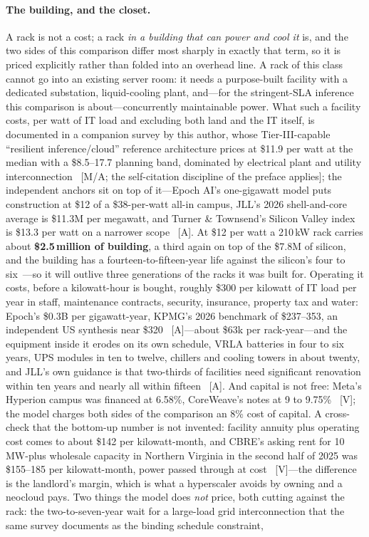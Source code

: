 \paragraph{The building, and the closet.} A rack is not a cost; a rack \emph{in a building that can power and cool it} is, and the two sides of this comparison differ most sharply in exactly that term, so it is priced explicitly rather than folded into an overhead line. A rack of this class cannot go into an existing server room: it needs a purpose-built facility with a dedicated substation, liquid-cooling plant, and---for the stringent-SLA inference this comparison is about---concurrently maintainable power. What such a facility costs, per watt of IT load and excluding both land and the IT itself, is documented in a companion survey by this author, whose Tier-III-capable ``resilient inference/cloud'' reference architecture prices at \$11.9 per watt at the median with a \$8.5--17.7 planning band, dominated by electrical plant and utility interconnection~\cite{matsuoka-dc-survey} [M/A; the self-citation discipline of the preface applies]; the independent anchors sit on top of it---Epoch AI's one-gigawatt model puts construction at \$12 of a \$38-per-watt all-in campus, JLL's 2026 shell-and-core average is \$11.3M per megawatt, and Turner \& Townsend's Silicon Valley index is \$13.3 per watt on a narrower scope~\cite{epoch-dc-tco,jll-dc-2026,dc-facility-costs} [A]. At \$12 per watt a 210\,kW rack carries about \textbf{\$2.5\,million of building}, a third again on top of the \$7.8M of silicon, and the building has a fourteen-to-fifteen-year life against the silicon's four to six~\cite{epoch-dc-tco,dc-reit-lives}---so it will outlive three generations of the racks it was built for. Operating it costs, before a kilowatt-hour is bought, roughly \$300 per kilowatt of IT load per year in staff, maintenance contracts, security, insurance, property tax and water: Epoch's \$0.3B per gigawatt-year, KPMG's 2026 benchmark of \$237--353, an independent US synthesis near \$320~\cite{epoch-dc-tco,kpmg-dc-opex} [A]---about \$63k per rack-year---and the equipment inside it erodes on its own schedule, VRLA batteries in four to six years, UPS modules in ten to twelve, chillers and cooling towers in about twenty, and JLL's own guidance is that two-thirds of facilities need significant renovation within ten years and nearly all within fifteen~\cite{dc-equipment-lives,jll-dc-2026} [A]. And capital is not free: Meta's Hyperion campus was financed at 6.58\%, CoreWeave's notes at 9 to 9.75\%~\cite{meta-hyperion-bond,coreweave-notes} [V]; the model charges both sides of the comparison an 8\% cost of capital. A cross-check that the bottom-up number is not invented: facility annuity plus operating cost comes to about \$142 per kilowatt-month, and CBRE's asking rent for 10\,MW-plus wholesale capacity in Northern Virginia in the second half of 2025 was \$155--185 per kilowatt-month, power passed through at cost~\cite{cbre-h2-2025} [V]---the difference is the landlord's margin, which is what a hyperscaler avoids by owning and a neocloud pays. Two things the model does \emph{not} price, both cutting against the rack: the two-to-seven-year wait for a large-load grid interconnection that the same survey documents as the binding schedule constraint, 